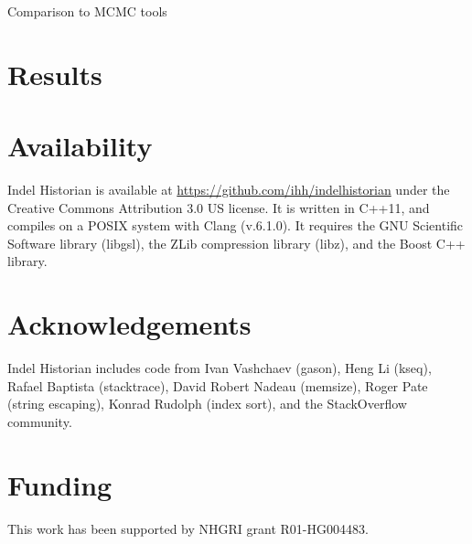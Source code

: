 \documentclass{bioinfo}
\begin{document}
Comparison to MCMC tools


\section{Results}



\section{Availability}

Indel Historian is available at \url{https://github.com/ihh/indelhistorian} under the Creative Commons Attribution 3.0 US license. It is written in C++11, and compiles on a POSIX system with Clang (v.6.1.0). It requires the GNU Scientific Software library (libgsl), the ZLib compression library (libz), and the Boost C++ library.

\section*{Acknowledgements}

Indel Historian includes code from Ivan Vashchaev (gason), Heng Li (kseq), Rafael Baptista (stacktrace), David Robert Nadeau (memsize), Roger Pate (string escaping), Konrad Rudolph (index sort), and the StackOverflow community.

\section*{Funding}

This work has been supported by NHGRI grant R01-HG004483.


%
%
%
%
%
%
%
%



\end{document}
